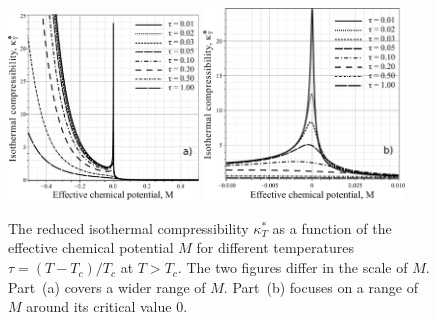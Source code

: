 \begin{figure}[h!]
	\centering \includegraphics[width=0.45\textwidth]{f2b.pdf}
	\includegraphics[width=0.475\textwidth]{f2c.pdf}
	\vskip-3mm\caption{The reduced isothermal compressibility $\kappa^*_T$ as a function of the effective chemical potential $M$ for different temperatures $\tau = (T - T_c)/T_c$ at $T > T_c$. The two figures differ in the scale of $M$. Part~(a) covers a wider range of $M$. Part~(b) focuses on a range of $M$ around its critical value $0$.
	}\label{fig2b}
\end{figure}

